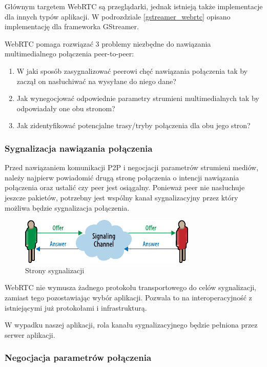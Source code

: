 Głównym targetem WebRTC są przeglądarki, jednak istnieją także implementacje dla innych typów
aplikacji. W podrozdziale \ref{gstreamer_webrtc} opisano implementację dla frameworka GStreamer.

WebRTC pomaga rozwiązać 3 problemy niezbędne do nawiązania multimedialnego połączenia peer-to-peer:

\begin{enumerate}
    \item W jaki sposób zasygnalizować peerowi chęć nawiązania połączenia tak by zaczął on
          nasłuchiwać na wysyłane do niego dane?
    \item Jak wynegocjować odpowiednie parametry strumieni multimedialnych tak by odpowiadały one
          obu stronom?
    \item Jak zidentyfikować potencjalne trasy/tryby połączenia dla obu jego stron?
\end{enumerate}

\subsubsection{Sygnalizacja nawiązania połączenia}

Przed nawiązaniem komunikacji P2P i negocjacji parametrów strumieni mediów, należy najpierw
powiadomić drugą stronę połączenia o intencji nawiązania połączenia oraz ustalić czy peer jest
osiągalny. Ponieważ peer nie nasłuchuje jeszcze pakietów, potrzebny jest wspólny kanał
sygnalizacyjny przez który możliwa będzie sygnalizacja połączenia.

\begin{figure}[H]
    \centering
    \includegraphics{img/signaling-1}
    \caption{Strony sygnalizacji}
    \label{fig:signaling}
\end{figure}

WebRTC nie wymusza żadnego protokołu transportowego do celów sygnalizacji, zamiast tego
pozostawiając wybór aplikacji. Pozwala to na interoperacyjność z istniejącymi już protokołami i
infrastrukturą.

W wypadku naszej aplikacji, rola kanału sygnalizacyjnego będzie pełniona przez serwer aplikacji.

\subsubsection{Negocjacja parametrów połączenia}
\label{negotiation}

